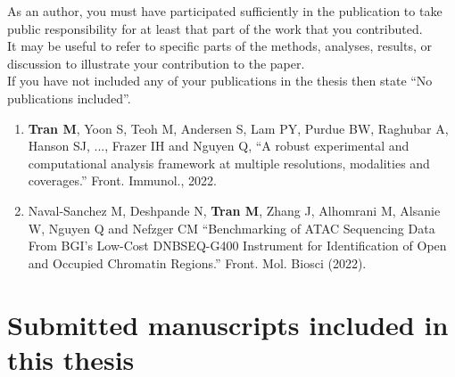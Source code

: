 \begin{instructional}
	\noindent
	As an author, you must have participated sufficiently in the publication to take public responsibility for at least that part of the work that you contributed.\\
    
    \noindent
	It may be useful to refer to specific parts of the methods, analyses, results, or discussion to illustrate your contribution to the paper.\\
    
    \noindent
	If you have not included any of your publications in the thesis then state ``No publications included''.\\
	
	\begin{enumerate}
    \item \cite{tran2022robust} \textbf{Tran M}, Yoon S, Teoh M, Andersen S, Lam PY, Purdue BW, Raghubar A, Hanson SJ, ..., Frazer IH and Nguyen Q, ``A robust experimental and computational analysis framework at multiple resolutions, modalities and coverages.'' Front. Immunol., 2022.
    \item \cite{naval2022benchmarking} Naval-Sanchez M, Deshpande N, \textbf{Tran M}, Zhang J, Alhomrani M, Alsanie W, Nguyen Q and Nefzger CM ``Benchmarking of ATAC Sequencing Data From BGI’s Low-Cost DNBSEQ-G400 Instrument for Identification of Open and Occupied Chromatin Regions.'' Front. Mol. Biosci (2022).


    \end{enumerate}
	
\end{instructional}





\section*{Submitted manuscripts included in this thesis}

